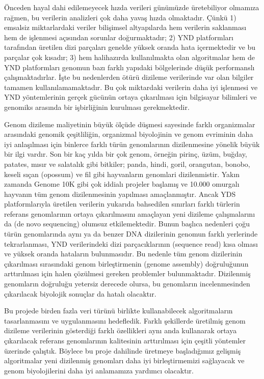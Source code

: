 \documentclass[11pt]{article}
\begin{document}
Önceden hayal dahi edilemeyecek hızda verileri günümüzde üretebiliyor olmamıza rağmen, bu verilerin analizleri çok daha yavaş hızda olmaktadır. Çünkü 1) emsalsiz miktarlardaki veriler bilişimsel altyapılarda hem verilerin saklanması hem de işlenmesi açısından sorunlar doğurmaktadır; 2) YND platformları tarafından üretilen dizi parçaları genelde yüksek oranda hata içermektedir ve bu parçalar çok kısadır; 3) hem halihazırda kullanılmakta olan algoritmalar hem de YND platformları genomun bazı farklı yapıdaki bölgelerinde düşük performanslı çalışmaktadırlar. İşte bu nedenlerden ötürü dizileme verilerinde var olan bilgiler tamamen kullanılamamaktadır. Bu çok miktardaki verilerin daha iyi işlenmesi ve YND yöntemlerinin gerçek gücünün ortaya çıkarılması için bilgisayar bilimleri ve genomiks arasında bir işbirliğinin kurulması gerekmektedir.

Genom dizileme maliyetinin büyük ölçüde düşmesi sayesinde farklı organizmalar arasındaki genomik çeşitliliğin, organizmal biyolojinin ve genom evriminin daha iyi anlaşılması için binlerce farklı türün genomlarının dizilenmesine yönelik büyük bir ilgi vardır. Son bir kaç yılda bir çok genom, örneğin pirinç, üzüm, buğday, patates, mısır ve salatalık gibi bitkiler; panda, hindi, goril, orangutan, bonobo, keseli sıçan (opossum) ve fil gibi hayvanların genomlari dizilenmistir. Yakın zamanda Genome 10K gibi çok iddialı projeler başlamış ve 10.000 omurgalı hayvanın tüm genom dizilenmesinin yapılması amaçlanmıştır. Ancak YDS platformlarıyla üretilen verilerin yukarıda bahsedilen sınırları farklı türlerin referans genomlarının ortaya çıkarılmasını amaçlayan yeni dizileme çalışmalarını da (de novo sequencing) olumsuz etkilemektedir. Bunun başlıca nedenleri çoğu türün genomlarında aynı ya da benzer DNA dizilerinin genomun farklı yerlerinde tekrarlanması, YND verilerindeki dizi parçacıklarının (sequence read) kısa olması ve yüksek oranda hataların bulunmasıdır. Bu nedenle tüm genom dizilerinin çıkarılması sırasındaki genom birleştirmenin (genome assembly) doğruluğunun arttırılması için halen çözülmesi gereken problemler bulunmaktadır. Dizilenmiş genomların doğruluğu yetersiz derecede olursa, bu genomların incelenmesinden çıkarılacak biyolojik sonuçlar da hatalı olacaktır.

Bu projede birden fazla veri türünü birlikte kullanabilecek algoritmaların tasarlanmasını ve uygulanmasını hedefledik. Farklı şekillerde üretilmiş genom dizileme verilerinin gösterdiği farklı özellikleri aynı anda kullanarak ortaya çıkarılacak referans genomlarının kalitesinin arttırılması için çeşitli yöntemler üzerinde çalıştık. Böylece bu proje dahilinde üretmeye başladığımız gelişmiş algoritmalar yeni dizilenmiş genomları daha iyi birleştirmemizi sağlayacak ve genom biyolojilerini daha iyi anlamamıza yardımcı olacaktır. 
\end{document}
